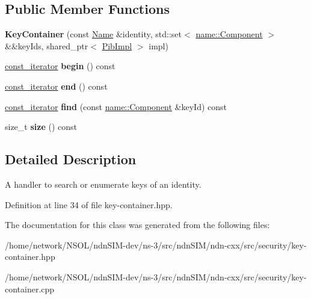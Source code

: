 \subsection*{Public Member Functions}
\begin{DoxyCompactItemize}
\item 
{\bfseries Key\+Container} (const \hyperlink{classndn_1_1Name}{Name} \&identity, std\+::set$<$ \hyperlink{classndn_1_1name_1_1Component}{name\+::\+Component} $>$ \&\&key\+Ids, shared\+\_\+ptr$<$ \hyperlink{classndn_1_1security_1_1PibImpl}{Pib\+Impl} $>$ impl)\hypertarget{classndn_1_1security_1_1KeyContainer_a1bc3680c80f5cafc8e6b6a144d32c257}{}\label{classndn_1_1security_1_1KeyContainer_a1bc3680c80f5cafc8e6b6a144d32c257}

\item 
\hyperlink{classndn_1_1security_1_1KeyContainer_1_1const__iterator}{const\+\_\+iterator} {\bfseries begin} () const\hypertarget{classndn_1_1security_1_1KeyContainer_aa0fcd8f4170707b29087407b09e94b71}{}\label{classndn_1_1security_1_1KeyContainer_aa0fcd8f4170707b29087407b09e94b71}

\item 
\hyperlink{classndn_1_1security_1_1KeyContainer_1_1const__iterator}{const\+\_\+iterator} {\bfseries end} () const\hypertarget{classndn_1_1security_1_1KeyContainer_aef75e95b5097168c017d62a98008da32}{}\label{classndn_1_1security_1_1KeyContainer_aef75e95b5097168c017d62a98008da32}

\item 
\hyperlink{classndn_1_1security_1_1KeyContainer_1_1const__iterator}{const\+\_\+iterator} {\bfseries find} (const \hyperlink{classndn_1_1name_1_1Component}{name\+::\+Component} \&key\+Id) const\hypertarget{classndn_1_1security_1_1KeyContainer_a11f507e30c5119d8f736c5330385044a}{}\label{classndn_1_1security_1_1KeyContainer_a11f507e30c5119d8f736c5330385044a}

\item 
size\+\_\+t {\bfseries size} () const\hypertarget{classndn_1_1security_1_1KeyContainer_ac1a42cb0a592193d8cc88aa1a9019887}{}\label{classndn_1_1security_1_1KeyContainer_ac1a42cb0a592193d8cc88aa1a9019887}

\end{DoxyCompactItemize}


\subsection{Detailed Description}
A handler to search or enumerate keys of an identity. 

Definition at line 34 of file key-\/container.\+hpp.



The documentation for this class was generated from the following files\+:\begin{DoxyCompactItemize}
\item 
/home/network/\+N\+S\+O\+L/ndn\+S\+I\+M-\/dev/ns-\/3/src/ndn\+S\+I\+M/ndn-\/cxx/src/security/key-\/container.\+hpp\item 
/home/network/\+N\+S\+O\+L/ndn\+S\+I\+M-\/dev/ns-\/3/src/ndn\+S\+I\+M/ndn-\/cxx/src/security/key-\/container.\+cpp\end{DoxyCompactItemize}
